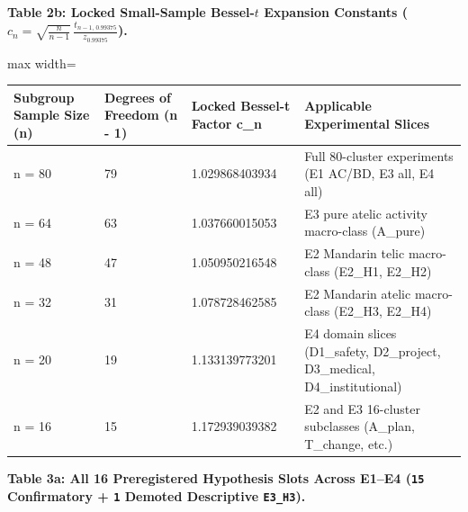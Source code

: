 \documentclass[11pt,a4paper]{article}
\begin{document}
\textbf{Table 2b: Locked Small-Sample Bessel-$t$ Expansion Constants ($c_n = \sqrt{\frac{n}{n-1}}\,\frac{t_{n-1,\,0.99375}}{z_{0.99375}}$).}

\begin{center}\begingroup\small\setlength{\tabcolsep}{4.5pt}\renewcommand{\arraystretch}{1.12}\begin{adjustbox}{max width=\textwidth}\begin{tabular}{llll}\toprule
\textbf{Subgroup Sample Size (n)} & \textbf{Degrees of Freedom (n - 1)} & \textbf{Locked Bessel-t Factor c\_\allowbreak{}n} & \textbf{Applicable Experimental Slices} \\ \midrule
n = 80 & 79 & 1.029868403934 & Full 80-cluster experiments (E1 AC/BD, E3 all, E4 all) \\
n = 64 & 63 & 1.037660015053 & E3 pure atelic activity macro-class (A\_\allowbreak{}pure) \\
n = 48 & 47 & 1.050950216548 & E2 Mandarin telic macro-class (E2\_\allowbreak{}H1, E2\_\allowbreak{}H2) \\
n = 32 & 31 & 1.078728462585 & E2 Mandarin atelic macro-class (E2\_\allowbreak{}H3, E2\_\allowbreak{}H4) \\
n = 20 & 19 & 1.133139773201 & E4 domain slices (D1\_\allowbreak{}safety, D2\_\allowbreak{}project, D3\_\allowbreak{}medical, D4\_\allowbreak{}institutional) \\
n = 16 & 15 & 1.172939039382 & E2 and E3 16-cluster subclasses (A\_\allowbreak{}plan, T\_\allowbreak{}change, etc.) \\
\bottomrule\end{tabular}\end{adjustbox}\endgroup\end{center}


\textbf{Table 3a: All 16 Preregistered Hypothesis Slots Across E1--E4 (\texttt{15} Confirmatory + \texttt{1} Demoted Descriptive \texttt{E3\_\allowbreak{}H3}).}
\end{document}
